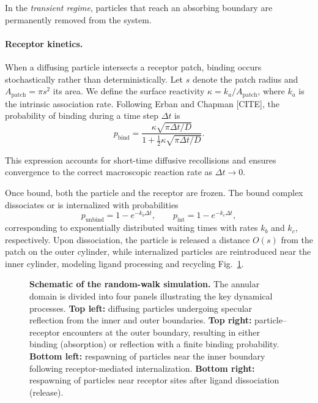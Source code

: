 In the \textit{transient regime}, particles that reach an absorbing boundary are permanently removed from the system.

\paragraph{Receptor kinetics.}
When a diffusing particle intersects a receptor patch, binding occurs stochastically rather than deterministically.
Let $s$ denote the patch radius and $A_{\mathrm{patch}} = \pi s^{2}$ its area.
We define the surface reactivity $\kappa = k_a / A_{\mathrm{patch}}$, where $k_a$ is the intrinsic association rate.
Following Erban and Chapman [CITE], the probability of binding during a time step $\Delta t$ is
\begin{equation}
    p_{\mathrm{bind}} = \frac{\kappa \sqrt{\pi \Delta t / D}}{1 + \tfrac{1}{2} \kappa \sqrt{\pi \Delta t / D}}.
    \label{eq:p_bind}
\end{equation}

This expression accounts for short-time diffusive recollisions and ensures convergence to the correct macroscopic reaction rate as $\Delta t \to 0$.

Once bound, both the particle and the receptor are frozen.
The bound complex dissociates or is internalized with probabilities
\begin{equation}
    p_{\mathrm{unbind}} = 1 - e^{-k_b \Delta t}, \qquad p_{\mathrm{int}} = 1 - e^{-k_c \Delta t},
    \label{eq:p_unbind_int}
\end{equation}
corresponding to exponentially distributed waiting times with rates $k_b$ and $k_c$, respectively.
Upon dissociation, the particle is released a distance $O(s)$ from the patch on the outer cylinder, while internalized particles are reintroduced near the inner cylinder, modeling ligand processing and recycling Fig.~\ref{fig:rw_schematic}.

\begin{figure}[H]
    \centering
    \caption{\textbf{Schematic of the random-walk simulation.} The annular domain is divided into four panels illustrating the key dynamical processes. \textbf{Top left:} diffusing particles undergoing specular reflection from the inner and outer boundaries. \textbf{Top right:} particle--receptor encounters at the outer boundary, resulting in either binding (absorption) or reflection with a finite binding probability. \textbf{Bottom left:} respawning of particles near the inner boundary following receptor-mediated internalization. \textbf{Bottom right:} respawning of particles near receptor sites after ligand dissociation (release).}
    \label{fig:rw_schematic}
\end{figure}

